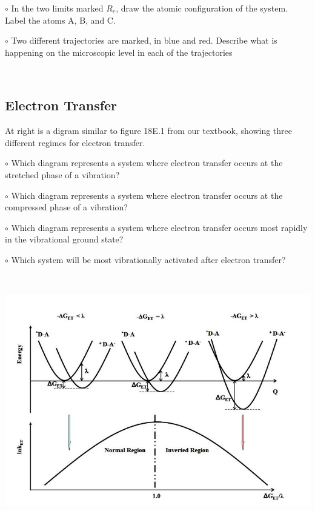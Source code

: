 \documentclass[11pt, letterpaper]{memoir}
\begin{document}
{\begin{minipage}{0.65\linewidth}
\noindent
$\circ$ In the two limits marked $R_e$, draw the atomic configuration of the system. Label the  atoms A, B, and C.

\noindent
$\circ$ Two different trajectories are marked, in blue and red. Describe what is happening on the microscopic level in each of the trajectories

\vspace{5em}
~
\end{minipage}


\subsection*{Electron Transfer}
\noindent
\begin{minipage}{0.5\linewidth}
	At right is a digram similar to figure 18E.1 from our textbook, showing three different regimes for electron transfer.
	
	\noindent
	$\circ$ Which diagram represents a system where electron transfer occurs at the stretched phase of a vibration?
	
	\noindent
	$\circ$ Which diagram represents a system where electron transfer occurs at the compressed phase of a vibration?
	
	\noindent
	$\circ$ Which diagram represents a system where electron transfer occurs most rapidly in the vibrational ground state?
	
	\noindent
	$\circ$ Which system will be most vibrationally activated after electron transfer?
	
\end{minipage} ~ ~ 
\begin{minipage}{0.5\linewidth}\noindent

	\includegraphics[width=\linewidth]{Marcus}
\end{minipage}
\newpage
\pagestyle{empty}
\addtocounter{page}{-1}	
}
\end{document}
